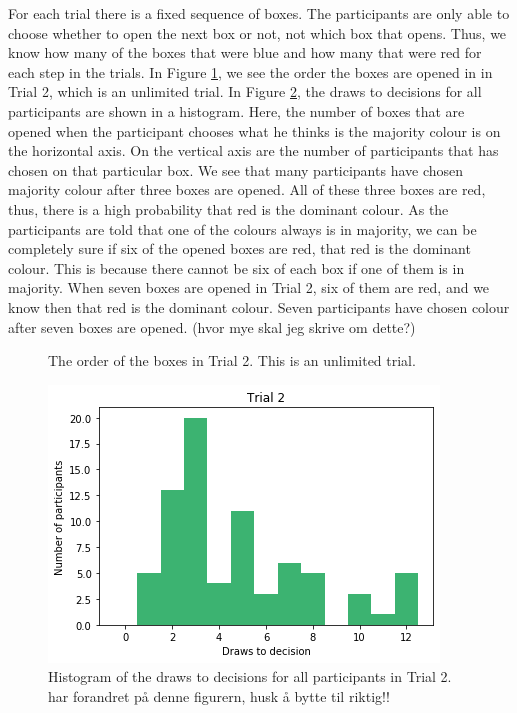 For each trial there is a fixed sequence of boxes. The participants are only able to choose whether to open the next box or not, not which box that opens. Thus, we know how many of the boxes that were blue and how many that were red for each step in the trials. In Figure \ref{fig:trial2_order}, we see the order the boxes are opened in in Trial 2, which is an unlimited trial. In Figure \ref{fig:histogram_trial2}, the draws to decisions for all participants are shown in a histogram. Here, the number of boxes that are opened when the participant chooses what he thinks is the majority colour is on the horizontal axis. On the vertical axis are the number of participants that has chosen on that particular box. We see that many participants have chosen majority colour after three boxes are opened. All of these three boxes are red, thus, there is a high probability that red is the dominant colour. 
As the participants are told that one of the colours always is in majority, we can be completely sure if six of the opened boxes are red, that red is the dominant colour. This is because there cannot be six of each box if one of them is in majority. When seven boxes are opened in Trial 2, six of them are red, and we know then that red is the dominant colour. Seven participants have chosen colour after seven boxes are opened. (hvor mye skal jeg skrive om dette?)
\begin{figure}
    \centering
    \scalebox{0.8}{}
    \caption[Order of boxes in Trial 2]{The order of the boxes in Trial 2. This is an unlimited trial.}
    \label{fig:trial2_order}
\end{figure}


\begin{figure}
    \centering
    \includegraphics[scale=0.6]{pictures/dtd2_histogram.png}
    \caption[Draws to decisions in Trial 2]{Histogram of the draws to decisions for all participants in Trial 2. 
    har forandret på denne figurern, husk å bytte til riktig!!}
    \label{fig:histogram_trial2}
\end{figure}


